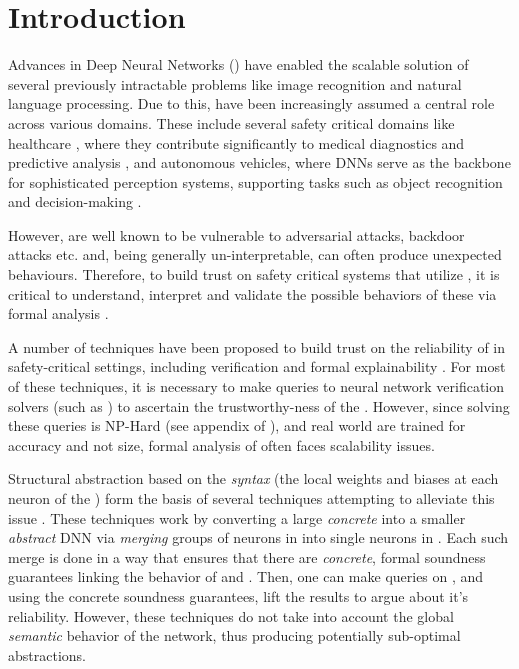 
\section{Introduction}

Advances in Deep Neural Networks (\dnn) have enabled the scalable solution
of several previously intractable problems like image recognition and natural
language processing. Due to this, \dnn have been increasingly assumed a central
role across various domains. These include several safety critical domains like
healthcare \cite{b1}, where they contribute significantly to medical diagnostics
and predictive analysis \cite{b2}, and autonomous vehicles, where DNNs serve as
the backbone for sophisticated perception systems, supporting tasks such as
object recognition and decision-making \cite{b3}. 

However, \dnn are well known to be vulnerable to adversarial attacks,
backdoor attacks \cite{backdoor-poisoning} etc.  and, being generally
un-interpretable, can often produce 
unexpected behaviours. Therefore, to build trust on safety critical systems 
that utilize \dnn, it is  critical to understand, interpret 
and validate the possible behaviors of these \dnn via formal analysis
\cite{overview-fxai, minimal-image-fxai, backdoor-verification, nn-lander-verif,
camera-verif-dsouza, generalization-verif}.

A number of techniques have been proposed to build trust on the reliability
of \dnn in safety-critical settings, including verification \cite{reluplex,
deeppoly, crown, beta-crown, cegar-nn}  and formal
explainability \cite{overview-fxai, minimal-image-fxai}. For most of these
techniques, it is necessary to make queries to neural
network verification solvers (such as \cite{reluplex, beta-crown}) to ascertain
the trustworthy-ness of the \dnn.
 However, since solving these queries is NP-Hard (see appendix of
\cite{reluplex}), and real world \dnn are trained for accuracy and not 
size, formal analysis of \dnn often faces scalability issues.

Structural abstraction based on the \textit{syntax} (the local weights and
biases at each
neuron of the \dnn) form the basis of several techniques attempting to alleviate
this issue \cite{cegar-nn, cegarette, cleverest-nn, conv-abs-gk}. These
techniques work by converting a large \textit{concrete} \dnn \cnc into a smaller
\textit{abstract} DNN \abs via \textit{merging} groups of neurons in \cnc into
single neurons in \abs. Each such
merge is done in a way that ensures that there are \textit{concrete}, formal
soundness guarantees linking the behavior of \cnc and \abs. Then, one
can make queries on \abs, and using the concrete soundness guarantees,
lift the results to \cnc argue about it's reliability. However, these techniques
do not take into account the global \textit{semantic} behavior of the network,
thus producing potentially sub-optimal abstractions.

